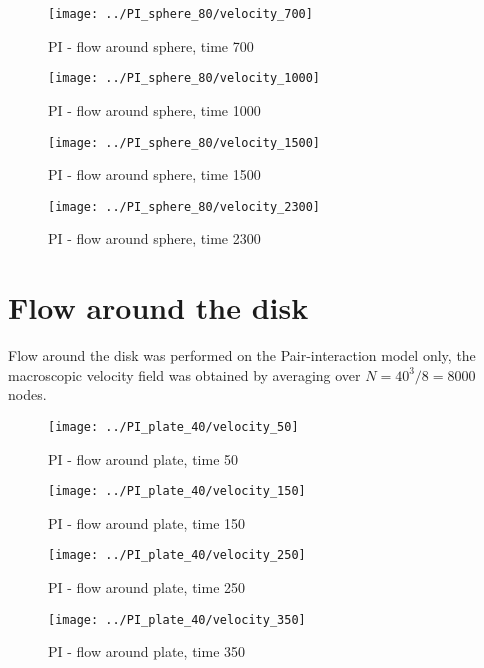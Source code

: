 \begin{figure}[htbp]
 \centering 
 \texttt{[image: ../PI\_sphere\_80/velocity\_700]}
 \label{transitions}
 \caption{PI - flow around sphere, time 700}
\end{figure}


\begin{figure}[htbp]
 \centering 
 \texttt{[image: ../PI\_sphere\_80/velocity\_1000]}
 \label{transitions}
 \caption{PI - flow around sphere, time 1000}
\end{figure}


\begin{figure}[htbp]
 \centering 
 \texttt{[image: ../PI\_sphere\_80/velocity\_1500]}
 \label{transitions}
 \caption{PI - flow around sphere, time 1500}
\end{figure}


\begin{figure}[htbp]
 \centering 
 \texttt{[image: ../PI\_sphere\_80/velocity\_2300]}
 \label{transitions}
 \caption{PI - flow around sphere, time 2300}
\end{figure}


\section{Flow around the disk}
Flow around the disk was performed on the Pair-interaction model only, the macroscopic velocity field was obtained by averaging over $N = 40^3 /8 = 8000$ nodes.

\begin{figure}[htbp]
 \centering 
 \texttt{[image: ../PI\_plate\_40/velocity\_50]}
 \label{transitions}
 \caption{PI - flow around plate, time 50}
\end{figure}

\begin{figure}[htbp]
 \centering 
 \texttt{[image: ../PI\_plate\_40/velocity\_150]}
 \label{transitions}
 \caption{PI - flow around plate, time 150}
\end{figure}

\begin{figure}[htbp]
 \centering 
 \texttt{[image: ../PI\_plate\_40/velocity\_250]}
 \label{transitions}
 \caption{PI - flow around plate, time 250}
\end{figure}


\begin{figure}[htbp]
 \centering 
 \texttt{[image: ../PI\_plate\_40/velocity\_350]}
 \label{transitions}
 \caption{PI - flow around plate, time 350}
\end{figure}

